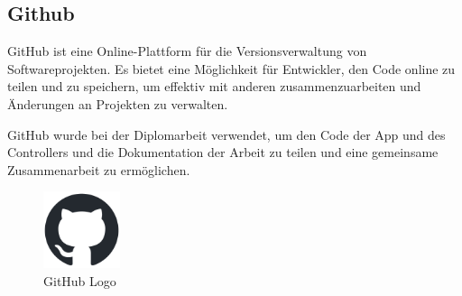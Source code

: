 \subsection{Github}
\label{sec:github}

GitHub ist eine Online-Plattform für die Versionsverwaltung von Softwareprojekten. Es bietet eine Möglichkeit für Entwickler, den Code online zu teilen und zu speichern, um effektiv mit anderen zusammenzuarbeiten und Änderungen an Projekten zu verwalten. 

\noindent GitHub wurde bei der Diplomarbeit verwendet, um den Code der App und des Controllers und die Dokumentation der Arbeit zu teilen und eine gemeinsame Zusammenarbeit zu ermöglichen.

\begin{figure}[H]
    \centering
    \includegraphics[width=0.2\textwidth]{images/github-mark.png}
    \caption{GitHub Logo }
    \label{fig:githublogo}
\end{figure}